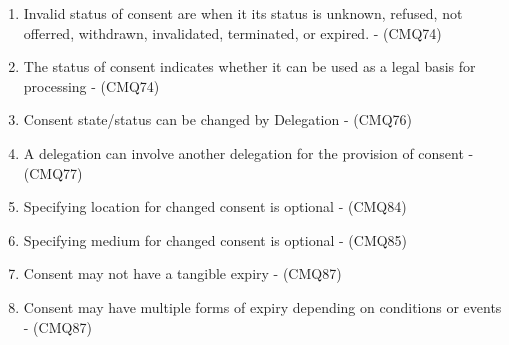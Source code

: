 \begin{enumerate}[label={\textit{A.\theenumi}}]
    \item Invalid status of consent are when it its status is unknown, refused, not offerred, withdrawn, invalidated, terminated, or expired. - (CMQ74)
    \item The status of consent indicates whether it can be used as a legal basis for processing - (CMQ74)
    \item Consent state/status can be changed by Delegation - (CMQ76)
    \item A delegation can involve another delegation for the provision of consent - (CMQ77)
    \item Specifying location for changed consent is optional - (CMQ84)
    \item Specifying medium for changed consent is optional - (CMQ85)
    \item Consent may not have a tangible expiry - (CMQ87)
    \item Consent may have multiple forms of expiry depending on conditions or events - (CMQ87)
\end{enumerate}

